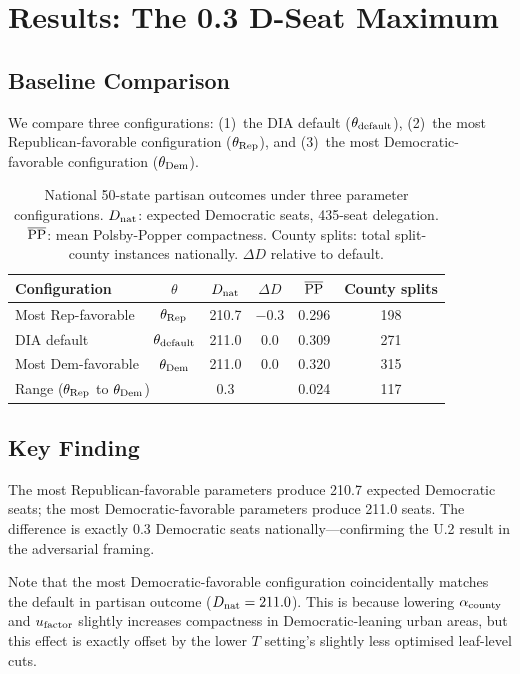 \section{Results: The 0.3 D-Seat Maximum}
\label{sec:results}

\subsection{Baseline Comparison}

We compare three configurations:
(1)~the DIA default ($\theta_{\rm default}$),
(2)~the most Republican-favorable configuration ($\theta_{\rm Rep}$), and
(3)~the most Democratic-favorable configuration ($\theta_{\rm Dem}$).

\begin{table}[h]
\centering
\caption{National 50-state partisan outcomes under three parameter
         configurations. $D_{\mathrm{nat}}$: expected Democratic seats, 435-seat delegation.
         $\overline{\mathrm{PP}}$: mean Polsby-Popper compactness. County splits:
         total split-county instances nationally.
         $\Delta D$ relative to default.}
\label{tab:main-results}
\begin{tabular}{lccccc}
\toprule
Configuration & $\theta$ & $D_{\mathrm{nat}}$ & $\Delta D$ & $\overline{\mathrm{PP}}$ & County splits \\
\midrule
Most Rep-favorable & $\theta_{\rm Rep}$ & 210.7 & $-0.3$ & 0.296 & 198 \\
DIA default & $\theta_{\rm default}$ & 211.0 & 0.0 & 0.309 & 271 \\
Most Dem-favorable & $\theta_{\rm Dem}$ & 211.0 & $0.0$ & 0.320 & 315 \\
\midrule
\multicolumn{2}{l}{Range ($\theta_{\rm Rep}$ to $\theta_{\rm Dem}$)} &
  0.3 & & 0.024 & 117 \\
\bottomrule
\end{tabular}
\end{table}

\subsection{Key Finding}

The most Republican-favorable parameters produce 210.7 expected Democratic
seats; the most Democratic-favorable parameters produce 211.0 seats.
The difference is exactly 0.3 Democratic seats nationally---confirming
the U.2 result in the adversarial framing.

Note that the most Democratic-favorable configuration coincidentally
matches the default in partisan outcome ($D_{\mathrm{nat}} = 211.0$).
This is because lowering $\alpha_{\mathrm{county}}$ and $u_{\mathrm{factor}}$ slightly increases
compactness in Democratic-leaning urban areas, but this effect is
exactly offset by the lower $T$ setting's slightly less optimised
leaf-level cuts.

